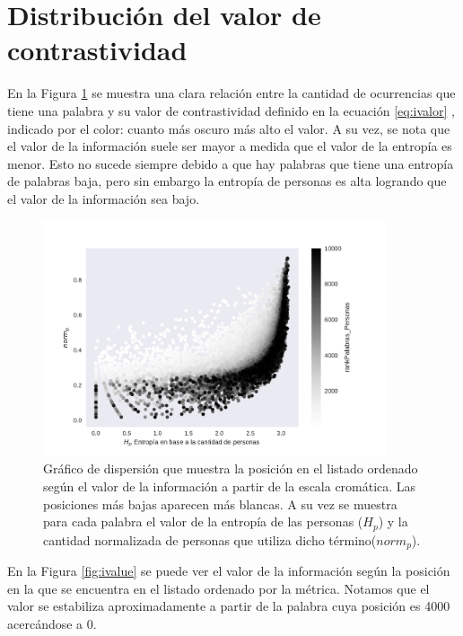 \section{Distribución del valor de contrastividad}
\label{sec:ValorDeLaInformacion}
En la Figura \ref{fig:infoValue} se muestra una clara relación entre la cantidad de ocurrencias que tiene una palabra y su valor de contrastividad definido en la ecuación \ref{eq:ivalor} , indicado por el color: cuanto más oscuro más alto el valor. A su vez, se nota que el valor de la información suele ser mayor a medida que el valor de la entropía es menor. Esto no sucede siempre debido a que hay palabras que tiene una entropía de palabras baja, pero sin embargo la entropía de personas es alta logrando que el valor de la información sea bajo.

\begin{figure}[h]
\centering
\includegraphics[width=0.9\textwidth]{./images/entropiaPersonasxNormCantPersonas.pdf}
\caption{Gráfico de dispersión que muestra la posición en el listado ordenado según el valor de la información a partir de la escala cromática. Las posiciones más bajas aparecen más blancas. A su vez se muestra para cada palabra el valor de la entropía de las personas ($H_p$) y la cantidad normalizada de personas que utiliza dicho término($norm_p$). } 
\label{fig:infoValue} 
\end{figure}

En la Figura \ref{fig:ivalue} se puede ver el valor de la información según la posición en la que se encuentra en el listado ordenado por la métrica. Notamos que el valor se estabiliza aproximadamente a partir de la palabra cuya posición es 4000 acercándose a 0.


